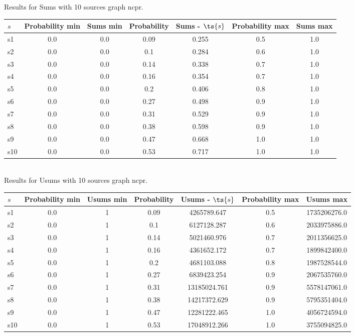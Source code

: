 \documentclass{article}
\begin{document}
\noindent Results for Sums with 10 sources graph ncpr.

\noindent\begin{tabular}{|l|c|c|c|c|c|c|}
\hline
$s$& Probability min & Sums min & Probability & Sums - $\ts{s}$ & Probability max & Sums max\\
\hline
s1 &0.0 & 0.0 & 0.09 & 0.255 & 0.5 & 1.0\\
\hline
s2 &0.0 & 0.0 & 0.1 & 0.284 & 0.6 & 1.0\\
\hline
s3 &0.0 & 0.0 & 0.14 & 0.338 & 0.7 & 1.0\\
\hline
s4 &0.0 & 0.0 & 0.16 & 0.354 & 0.7 & 1.0\\
\hline
s5 &0.0 & 0.0 & 0.2 & 0.406 & 0.8 & 1.0\\
\hline
s6 &0.0 & 0.0 & 0.27 & 0.498 & 0.9 & 1.0\\
\hline
s7 &0.0 & 0.0 & 0.31 & 0.529 & 0.9 & 1.0\\
\hline
s8 &0.0 & 0.0 & 0.38 & 0.598 & 0.9 & 1.0\\
\hline
s9 &0.0 & 0.0 & 0.47 & 0.668 & 1.0 & 1.0\\
\hline
s10 &0.0 & 0.0 & 0.53 & 0.717 & 1.0 & 1.0\\
\hline
\end{tabular}\\

\noindent Results for Usums with 10 sources graph ncpr.

\noindent\begin{tabular}{|l|c|c|c|c|c|c|}
\hline
$s$& Probability min & Usums min & Probability & Usums - $\ts{s}$ & Probability max & Usums max\\
\hline
s1 &0.0 & 1 & 0.09 & 4265789.647 & 0.5 & 1735206276.0\\
\hline
s2 &0.0 & 1 & 0.1 & 6127128.287 & 0.6 & 2033975886.0\\
\hline
s3 &0.0 & 1 & 0.14 & 5021460.976 & 0.7 & 2011356625.0\\
\hline
s4 &0.0 & 1 & 0.16 & 4361652.172 & 0.7 & 1899842400.0\\
\hline
s5 &0.0 & 1 & 0.2 & 4681103.088 & 0.8 & 1987528544.0\\
\hline
s6 &0.0 & 1 & 0.27 & 6839423.254 & 0.9 & 2067535760.0\\
\hline
s7 &0.0 & 1 & 0.31 & 13185024.761 & 0.9 & 5578147061.0\\
\hline
s8 &0.0 & 1 & 0.38 & 14217372.629 & 0.9 & 5795351404.0\\
\hline
s9 &0.0 & 1 & 0.47 & 12281222.465 & 1.0 & 4056724594.0\\
\hline
s10 &0.0 & 1 & 0.53 & 17048912.266 & 1.0 & 3755094825.0\\
\hline
\end{tabular}\\
\end{document}
